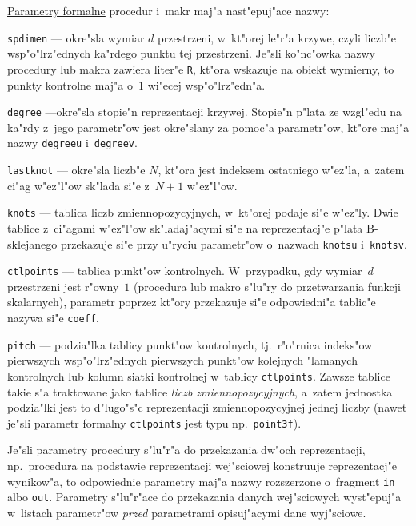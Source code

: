 \underline{Parametry formalne} procedur i~makr maj"a nast"epuj"ace nazwy:
\begin{mydescription}
  \item\texttt{spdimen} --- okre"sla wymiar $d$ przestrzeni, w~kt"orej le"r"a
    krzywe, czyli liczb"e wsp"o"lrz"ednych ka"rdego punktu tej przestrzeni.
    Je"sli ko"nc"owka nazwy procedury lub makra zawiera liter"e \texttt{R},
    kt"ora wskazuje na obiekt wymierny, to punkty kontrolne maj"a o~$1$
    wi"ecej wsp"o"lrz"edn"a.
  \item\texttt{degree} ---okre"sla stopie"n reprezentacji krzywej. Stopie"n
    p"lata ze wzgl"e\-du na ka"rdy z~jego parametr"ow jest okre"slany za
    pomoc"a parametr"ow, kt"ore maj"a nazwy \texttt{degreeu}
    i~\texttt{degreev}.
  \item\texttt{lastknot} --- okre"sla liczb"e $N$, kt"ora jest indeksem
    ostatniego w"ez"la, a~zatem ci"ag w"ez"l"ow sk"lada si"e z~$N+1$
    w"ez"l"ow.
  \item\texttt{knots} --- tablica liczb zmiennopozycyjnych, w~kt"orej podaje
    si"e w"ez"ly. Dwie tablice z~ci"agami w"ez"l"ow sk"ladaj"acymi si"e na
    reprezentacj"e p"lata B-sklejanego przekazuje si"e przy u"ryciu
    parametr"ow o~nazwach \texttt{knotsu} i~\texttt{knotsv}.
  \item\texttt{ctlpoints} --- tablica punkt"ow kontrolnych. W~przypadku, gdy
    wymiar~$d$ przes\-trze\-ni jest r"owny~$1$ (procedura lub makro s"lu"ry do
    przetwarzania funkcji skalarnych), parametr poprzez kt"ory przekazuje
    si"e odpowiedni"a tablic"e nazywa si"e \texttt{coeff}.
  \item\texttt{pitch} --- podzia"lka tablicy punkt"ow kontrolnych, tj.\
    r"o"rnica indeks"ow pierwszych wsp"o"lrz"ednych pierwszych punkt"ow
    kolejnych "lamanych kontrolnych lub kolumn siatki kontrolnej w~tablicy
    \texttt{ctlpoints}. Zawsze tablice takie s"a traktowane jako tablice
    \emph{liczb zmiennopozycyjnych}, a~zatem jednostka podzia"lki jest to
    d"lugo"s"c reprezentacji zmiennopozycyjnej jednej liczby (nawet je"sli
    parametr formalny \texttt{ctlpoints} jest typu np.\ \texttt{point3f}).
\end{mydescription}
Je"sli parametry procedury s"lu"r"a do przekazania dw"och reprezentacji,
np.\ procedura na podstawie reprezentacji wej"sciowej konstruuje
reprezentacj"e wynikow"a, to odpowiednie parametry maj"a nazwy rozszerzone
o~fragment \texttt{in} albo \texttt{out}. Parametry s"lu"r"ace do
przekazania danych wej"sciowych wyst"epuj"a w~listach parametr"ow
\emph{przed} parametrami opisuj"acymi dane wyj"sciowe.



